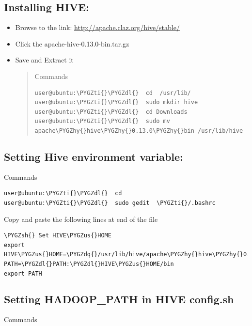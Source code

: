 \documentclass[letterpaper,10pt,english]{sphinxmanual}
\def\PYGZus{\char`\_}
\def\PYGZsh{\char`\#}
\def\PYGZdl{\char`\$}
\def\PYGZhy{\char`\-}
\def\PYGZdq{\char`\"}
\def\PYGZti{\char`\~}
\begin{document}
\subsection{Installing HIVE:}
\label{hive:installing-hive}\begin{itemize}
\item {} 
Browse to the link: \href{http://apache.claz.org/hive/stable/}{http://apache.claz.org/hive/stable/}

\item {} 
Click the apache-hive-0.13.0-bin.tar.gz

\item {} 
Save and Extract it
\begin{quote}

Commands

\begin{Verbatim}[commandchars=\\\{\}]
user@ubuntu:\PYGZti{}\PYGZdl{}  cd  /usr/lib/
user@ubuntu:\PYGZti{}\PYGZdl{}  sudo mkdir hive
user@ubuntu:\PYGZti{}\PYGZdl{}  cd Downloads
user@ubuntu:\PYGZti{}\PYGZdl{}  sudo mv apache\PYGZhy{}hive\PYGZhy{}0.13.0\PYGZhy{}bin /usr/lib/hive
\end{Verbatim}
\end{quote}

\end{itemize}


\subsection{Setting Hive environment variable:}
\label{hive:setting-hive-environment-variable}
Commands

\begin{Verbatim}[commandchars=\\\{\}]
user@ubuntu:\PYGZti{}\PYGZdl{}  cd
user@ubuntu:\PYGZti{}\PYGZdl{}  sudo gedit  \PYGZti{}/.bashrc
\end{Verbatim}

Copy and paste the following lines at end of the file

\begin{Verbatim}[commandchars=\\\{\}]
\PYGZsh{} Set HIVE\PYGZus{}HOME
export HIVE\PYGZus{}HOME=\PYGZdq{}/usr/lib/hive/apache\PYGZhy{}hive\PYGZhy{}0.13.0\PYGZhy{}bin\PYGZdq{}
PATH=\PYGZdl{}PATH:\PYGZdl{}HIVE\PYGZus{}HOME/bin
export PATH
\end{Verbatim}


\subsection{Setting HADOOP\_PATH in HIVE config.sh}
\label{hive:setting-hadoop-path-in-hive-config-sh}
Commands
\end{document}
